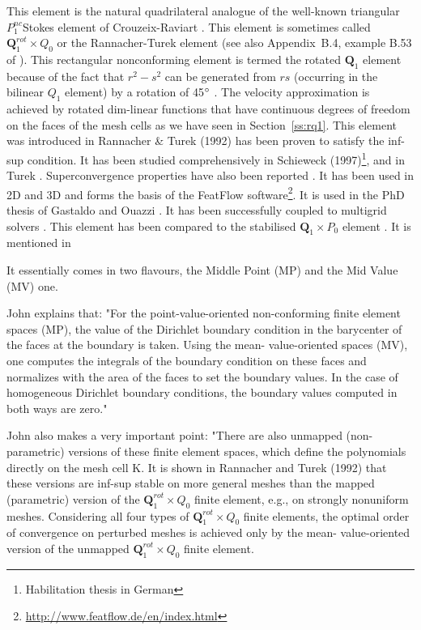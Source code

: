 

This element is the natural quadrilateral analogue
of the well-known triangular $P_1^{nc} $Stokes element of Crouzeix-Raviart \cite{crra73}.
This element is sometimes called ${\bm Q}_1^{rot} \times Q_0$ or the Rannacher-Turek element 
\cite[Section 3.6.5]{john16} (see also Appendix~B.4, example B.53 of \textcite{john16}).
This rectangular nonconforming \cite{crfa89} element is termed the rotated ${\bm Q}_1$ element 
because of the fact that $r^2-s^2$ can be generated from $rs$ (occurring in the bilinear $Q_1$ 
element) by a rotation of 45$\degree$ \cite[p93]{chen}.
The velocity approximation is achieved by rotated dim-linear functions that have 
continuous degrees of freedom on
the faces of the mesh cells as we have seen in Section~\ref{ss:rq1}.
This element was introduced in Rannacher \& Turek (1992) \cite{ratu92} 
has been proven to satisfy the inf-sup condition. It has been studied comprehensively in Schieweck 
(1997)\footnote{Habilitation thesis in German}, \cite{shzh06} and in Turek \cite{ture94,ture96}.
Superconvergence properties have also been reported \cite{misx06,misx07}.
It has been used in 2D \cite{maky17} and 3D \cite{klll96,gekm08} and forms the basis of the FeatFlow 
software\footnote{\url{http://www.featflow.de/en/index.html}}. 
It is used in the PhD thesis of Gastaldo \cite{gast07} and Ouazzi \cite{ouaz05}.
It has been 
successfully coupled to multigrid solvers \cite{chos98,tuos02}.
This element has been compared to the stabilised ${\bm Q}_1\times P_0$ element \cite{lisi13}.
It is mentioned in \cite{hans11}

It essentially comes in two flavours, the Middle Point (MP) and the Mid Value (MV) one.

\begin{remark} 
John \cite{john16} explains that: "For the point-value-oriented non-conforming finite element spaces (MP), 
the value of the Dirichlet boundary
condition in the barycenter of the faces at the boundary is taken. Using the mean-
value-oriented spaces (MV), one computes the integrals of the boundary condition on
these faces and normalizes with the area of the faces to set the boundary values.
In the case of homogeneous Dirichlet boundary conditions, the boundary values
computed in both ways are zero."
\end{remark}

\begin{remark} 
John also makes a very important point: "There are also unmapped (non-parametric) versions of 
these finite element spaces, which define the polynomials directly on the mesh cell K. It is shown in Rannacher
and Turek (1992) \cite{ratu92} that these versions are inf-sup stable on more general meshes than
the mapped (parametric) version of the ${\bm Q}_1^{rot}\times Q_0$ finite element, e.g., on strongly
nonuniform meshes. Considering all four types of ${\bm Q}_1^{rot}\times Q_0$ finite elements, the
optimal order of convergence on perturbed meshes is achieved only by the mean-
value-oriented version of the unmapped ${\bm Q}_1^{rot}\times Q_0$   finite element.
\end{remark}


